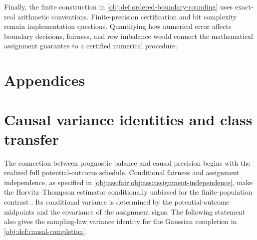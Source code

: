 \documentclass[11pt]{article}
\begin{document}
Finally, the finite construction in \cref{obj:def:ordered-boundary-rounding} uses exact-real arithmetic conventions. Finite-precision certification and bit complexity remain implementation questions. Quantifying how numerical error affects boundary decisions, fairness, and row imbalance would connect the mathematical assignment guarantee to a certified numerical procedure.


\appendix

\section*{Appendices}

\section{Causal variance identities and class transfer}

The connection between prognostic balance and causal precision begins with the realized full potential-outcome schedule. Conditional fairness and assignment independence, as specified in \cref{obj:ass:fair,obj:ass:assignment-independence}, make the Horvitz--Thompson estimator conditionally unbiased for the finite-population contrast \citep{Horvitz1952}. Its conditional variance is determined by the potential-outcome midpoints and the covariance of the assignment signs. The following statement also gives the sampling-law variance identity for the Gaussian completion in \cref{obj:def:causal-completion}.
\end{document}
